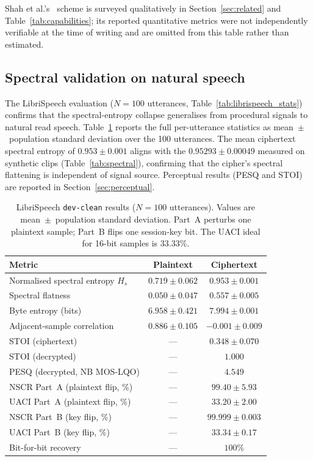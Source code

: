 \documentclass[pdflatex,sn-mathphys-num]{sn-jnl}%
\theoremstyle{thmstyleone}%
\theoremstyle{thmstyletwo}%
\theoremstyle{thmstylethree}%
\begin{document}
Shah et al.'s~\cite{shah2021} scheme is surveyed qualitatively in Section~\ref{sec:related} and Table~\ref{tab:capabilities}; its reported quantitative metrics were not independently verifiable at the time of writing and are omitted from this table rather than estimated.

\subsection{Spectral validation on natural speech}
\label{sec:libri}

The LibriSpeech evaluation ($N=100$ utterances, Table~\ref{tab:librispeech_stats}) confirms that the spectral-entropy collapse generalises from procedural signals to natural read speech. Table~\ref{tab:libri_results} reports the full per-utterance statistics as mean~$\pm$~population standard deviation over the 100 utterances. The mean ciphertext spectral entropy of $0.953 \pm 0.001$ aligns with the $0.95293 \pm 0.00049$ measured on synthetic clips (Table~\ref{tab:spectral}), confirming that the cipher's spectral flattening is independent of signal source. Perceptual results (PESQ and STOI) are reported in Section~\ref{sec:perceptual}.

\begin{table}[htbp]
\centering
\caption{LibriSpeech \texttt{dev-clean} results ($N=100$ utterances). Values are mean~$\pm$~population standard deviation. Part~A perturbs one plaintext sample; Part~B flips one session-key bit. The UACI ideal for 16-bit samples is $33.33\%$.}
\label{tab:libri_results}
\small
\begin{tabular}{lcc}
\toprule
\textbf{Metric} & \textbf{Plaintext} & \textbf{Ciphertext} \\
\midrule
Normalised spectral entropy $H_s$ & $0.719\pm0.062$ & $0.953\pm0.001$ \\
Spectral flatness & $0.050\pm0.047$ & $0.557\pm0.005$ \\
Byte entropy (bits) & $6.958\pm0.421$ & $7.994\pm0.001$ \\
Adjacent-sample correlation & $0.886\pm0.105$ & $-0.001\pm0.009$ \\
STOI (ciphertext) & --- & $0.348\pm0.070$ \\
STOI (decrypted) & --- & $1.000$ \\
PESQ (decrypted, NB MOS-LQO) & --- & $4.549$ \\
NSCR Part~A (plaintext flip, \%) & --- & $99.40\pm5.93$ \\
UACI Part~A (plaintext flip, \%) & --- & $33.20\pm2.00$ \\
NSCR Part~B (key flip, \%) & --- & $99.999\pm0.003$ \\
UACI Part~B (key flip, \%) & --- & $33.34\pm0.17$ \\
Bit-for-bit recovery & --- & $100\%$ \\
\bottomrule
\end{tabular}
\end{table}
\end{document}
